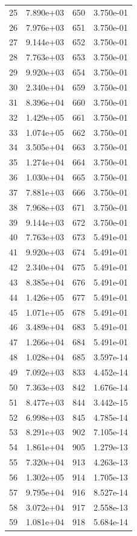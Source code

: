 \documentclass[12pt]{article}
\begin{document}
\begin{longtable}{@{}cccc@{}}
25 & 7.890e+03 & 650 & 3.750e-01 \\
26 & 7.976e+03 & 651 & 3.750e-01 \\
27 & 9.144e+03 & 652 & 3.750e-01 \\
28 & 7.763e+03 & 653 & 3.750e-01 \\
29 & 9.920e+03 & 654 & 3.750e-01 \\
30 & 2.340e+04 & 659 & 3.750e-01 \\
31 & 8.396e+04 & 660 & 3.750e-01 \\
32 & 1.429e+05 & 661 & 3.750e-01 \\
33 & 1.074e+05 & 662 & 3.750e-01 \\
34 & 3.505e+04 & 663 & 3.750e-01 \\
35 & 1.274e+04 & 664 & 3.750e-01 \\
36 & 1.030e+04 & 665 & 3.750e-01 \\
37 & 7.881e+03 & 666 & 3.750e-01 \\
38 & 7.968e+03 & 671 & 3.750e-01 \\
39 & 9.144e+03 & 672 & 3.750e-01 \\
40 & 7.763e+03 & 673 & 5.491e-01 \\
41 & 9.920e+03 & 674 & 5.491e-01 \\
42 & 2.340e+04 & 675 & 5.491e-01 \\
43 & 8.385e+04 & 676 & 5.491e-01 \\
44 & 1.426e+05 & 677 & 5.491e-01 \\
45 & 1.071e+05 & 678 & 5.491e-01 \\
46 & 3.489e+04 & 683 & 5.491e-01 \\
47 & 1.266e+04 & 684 & 5.491e-01 \\
48 & 1.028e+04 & 685 & 3.597e-14 \\
49 & 7.092e+03 & 833 & 4.452e-14 \\
50 & 7.363e+03 & 842 & 1.676e-14 \\
51 & 8.477e+03 & 844 & 3.442e-15 \\
52 & 6.998e+03 & 845 & 4.785e-14 \\
53 & 8.291e+03 & 902 & 7.105e-14 \\
54 & 1.861e+04 & 905 & 1.279e-13 \\
55 & 7.320e+04 & 913 & 4.263e-13 \\
56 & 1.302e+05 & 914 & 1.705e-13 \\
57 & 9.795e+04 & 916 & 8.527e-14 \\
58 & 3.072e+04 & 917 & 2.558e-13 \\
59 & 1.081e+04 & 918 & 5.684e-14 \\

\end{longtable}
\end{document}
